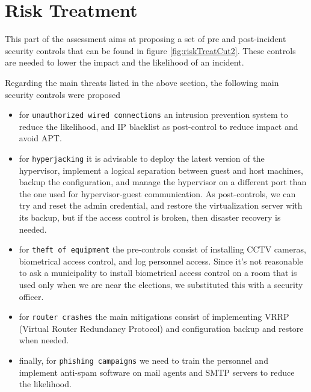 \section*{Risk Treatment}

This part of the assessment aims at proposing a set of pre and post-incident security controls that can be found in figure \ref{fig:riskTreatCut2}. These controls are needed to lower the impact and the likelihood of an incident.

Regarding the main threats listed in the above section, the following main security controls were proposed

\begin{itemize}
    \item for \texttt{unauthorized wired connections} an intrusion prevention system to reduce the likelihood, and IP blacklist as post-control to reduce impact and avoid APT.
    \item for \texttt{hyperjacking} it is advisable to deploy the latest version of the hypervisor, implement a logical separation between guest and host machines, backup the configuration, and manage the hypervisor on a different port than the one used for hypervisor-guest communication\cite{online:virtualSec}. As post-controls, we can try and reset the admin credential, and restore the virtualization server with its backup, but if the access control is broken, then disaster recovery is needed.
    \item for \texttt{theft of equipment} the pre-controls consist of installing CCTV cameras, biometrical access control, and log personnel access. Since it's not reasonable to ask a municipality to install biometrical access control on a room that is used only when we are near the elections, we substituted this with a security officer.\cite{online:roomSec}
    \item for \texttt{router crashes} the main mitigations consist of implementing VRRP (Virtual Router Redundancy Protocol) \cite{online:VRRP} and configuration backup and restore when needed.
    \item finally, for \texttt{phishing campaigns} we need to train the personnel and implement anti-spam software on mail agents and SMTP servers to reduce the likelihood.
\end{itemize}


